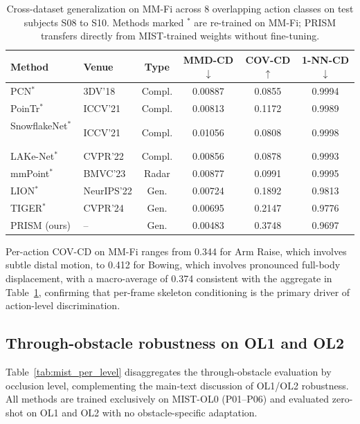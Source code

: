 \documentclass{article}
\begin{document}
\begin{table}[h]
  \centering
  \caption{Cross-dataset generalization on MM-Fi across 8 overlapping action classes on test subjects S08 to S10. Methods marked $^*$ are re-trained on MM-Fi; PRISM transfers directly from MIST-trained weights without fine-tuning.}
  \label{tab:mmfi_appendix}
  \small
  \setlength{\tabcolsep}{5pt}
  \begin{tabular}{llcccc}
    \toprule
    Method & Venue & Type
           & MMD-CD$\downarrow$ & COV-CD$\uparrow$ & 1-NN-CD$\downarrow$ \\
    \midrule
    PCN$^*$~\cite{pcn}               & 3DV'18     & Compl. & 0.00887 & 0.0855 & 0.9994 \\
    PoinTr$^*$~\cite{pointr}         & ICCV'21    & Compl. & 0.00813 & 0.1172 & 0.9989 \\
    SnowflakeNet$^*$~\cite{snowflake}& ICCV'21    & Compl. & 0.01056 & 0.0808 & 0.9998 \\
    LAKe-Net$^*$~\cite{lakenet}      & CVPR'22    & Compl. & 0.00856 & 0.0878 & 0.9993 \\
    mmPoint$^*$~\cite{mmpoint}       & BMVC'23    & Radar  & 0.00877 & 0.0991 & 0.9995 \\
    LION$^*$~\cite{lion}             & NeurIPS'22 & Gen.   & 0.00724 & 0.1892 & 0.9813 \\
    TIGER$^*$~\cite{tiger}           & CVPR'24    & Gen.   & 0.00695 & 0.2147 & 0.9776 \\
    \midrule
    PRISM (ours)                     & --         & Gen.   & 0.00483 & 0.3748 & 0.9697 \\
    \bottomrule
  \end{tabular}
\end{table}

Per-action COV-CD on MM-Fi ranges from 0.344 for Arm Raise, which involves subtle
distal motion, to 0.412 for Bowing, which involves pronounced full-body displacement,
with a macro-average of 0.374 consistent with the aggregate in Table~\ref{tab:mmfi_appendix},
confirming that per-frame skeleton conditioning is the primary driver of action-level
discrimination.

\subsection{Through-obstacle robustness on OL1 and OL2}
\label{app:mist_eval}

Table~\ref{tab:mist_per_level} disaggregates the through-obstacle evaluation
by occlusion level, complementing the main-text discussion of OL1/OL2 robustness.
All methods are trained exclusively on MIST-OL0 (P01--P06) and evaluated
zero-shot on OL1 and OL2 with no obstacle-specific adaptation.
\end{document}
